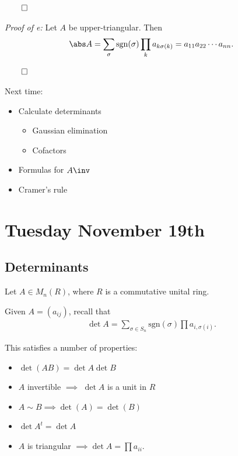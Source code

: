 \(\qed\)

\emph{Proof of e:} Let \(A\) be upper-triangular. Then
\begin{align*}
\abs A = \sum_\sigma \mathrm{sgn}(\sigma) \prod_k a_{k \sigma(k)} = a_{11} a_{22} \cdots a_{nn}
.\end{align*}

\(\qed\)

Next time:

\begin{itemize}
\tightlist
\item
  Calculate determinants

  \begin{itemize}
  \tightlist
  \item
    Gaussian elimination
  \item
    Cofactors
  \end{itemize}
\item
  Formulas for \(A\inv\)
\item
  Cramer's rule
\end{itemize}

\hypertarget{tuesday-november-19th}{%
\section{Tuesday November 19th}\label{tuesday-november-19th}}

\hypertarget{determinants-1}{%
\subsection{Determinants}\label{determinants-1}}

Let \(A\in M_n(R)\), where \(R\) is a commutative unital ring.

Given \(A = (a_{ij})\), recall that
\begin{align*}
\det A = \sum_{\sigma \in S_n} \mathrm{sgn}(\sigma) \prod a_{i, \sigma(i)}
.\end{align*}

This satisfies a number of properties:

\begin{itemize}
\item
  \(\det(AB) = \det A \det B\)
\item
  \(A\) invertible \(\implies\) \(\det A\) is a unit in \(R\)
\item
  \(A \sim B \implies \det(A) = \det(B)\)
\item
  \(\det A^t = \det A\)
\item
  \(A\) is triangular \(\implies \det A = \prod a_{ii}\).
\end{itemize}

